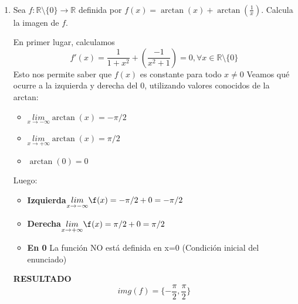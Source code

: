 \documentclass[12pt]{article}
\begin{document}
\newpage
\begin{ejercicio}\
\begin{enumerate}[label=\alph*)]
    \item Sea $f:\mathbb{R}\setminus \{0\}\longrightarrow \mathbb{R} $ definida por $f(x) = \arctan(x) + \arctan\left(\frac{1}{x}\right)$. Calcula la imagen de $f$.
           
    
    En primer lugar, calculamos $$f'(x) =  \frac1{1+x^2} + (\frac{-1}{x^2+1}) = 0, \forall x \in \mathbb{R}\setminus\{0\}$$
    Esto nos permite saber que $f(x)$ es constante para todo $x\neq 0$ \newline
    Veamos qué ocurre a la izquierda y derecha del 0, utilizando valores conocidos de la arctan:\begin{itemize}
        \item $\underset{x\to -\infty}{lim}\arctan(x)=-\pi/2$
        \item $\underset{x\to +\infty}{lim}\arctan(x)=\pi/2$
        \item $\arctan(0)=0$
    
    \end{itemize} 
    Luego: \begin{itemize}
        \item \textbf{Izquierda}$\underset{x\to -\infty}{lim}\f(x)=-\pi/2 + 0 = -\pi/2$
        \item \textbf{Derecha}$\underset{x\to +\infty}{lim}\f(x)=\pi/2 + 0 = \pi/2$
        \item \textbf{En 0} La función NO está definida en x=0 (Condición inicial del enunciado)
    \end{itemize}
    \textbf{RESULTADO} $$img(f) = \{-\frac\pi2, \frac\pi2\}$$

    \begin{center}
\end{center}
\end{enumerate}
\end{ejercicio}
\end{document}

